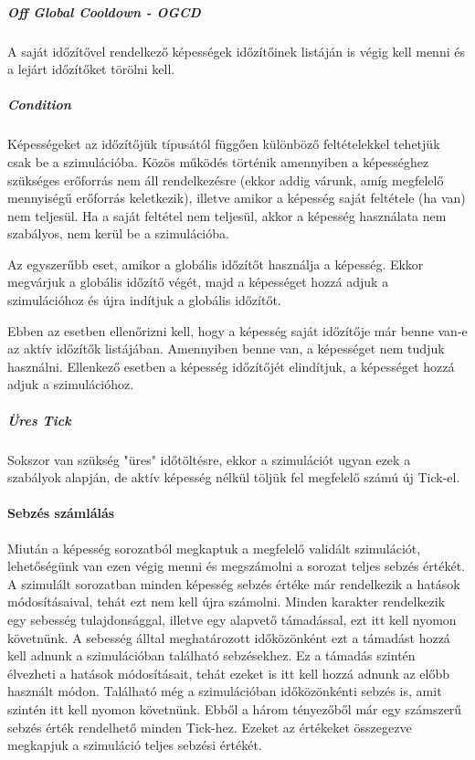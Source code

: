 \documentclass[12pt]{article}
\begin{document}
\subparagraph{Off Global Cooldown - OGCD}
A saját időzítővel rendelkező képességek időzítőinek listáján is végig kell menni és a lejárt időzítőket törölni kell.

\subparagraph{Condition}
Képességeket az időzítőjük típusától függően különböző feltételekkel tehetjük csak be a szimulációba.
Közös működés történik amennyiben a képességhez szükséges erőforrás nem áll rendelkezésre (ekkor addig várunk, amíg megfelelő mennyiségű erőforrás keletkezik), illetve amikor a képesség saját feltétele (ha van) nem teljesül. Ha a saját feltétel nem teljesül, akkor a képesség használata nem szabályos, nem kerül be a szimulációba.

\begin{description}[align=right,labelwidth=3cm]
	\item [GCD] Az egyszerűbb eset, amikor a globális időzítőt használja a képesség. Ekkor megvárjuk a globális időzítő végét, majd a képességet hozzá adjuk a szimulációhoz és újra indítjuk a globális időzítőt.
	\item [OGCD] Ebben az esetben ellenőrizni kell, hogy a képesség saját időzítője már benne van-e az aktív időzítők listájában. Amennyiben benne van, a képességet nem tudjuk használni. Ellenkező esetben a képesség időzítőjét elindítjuk, a képességet hozzá adjuk a szimulációhoz.
\end{description}

\subparagraph{Üres Tick}
Sokszor van szükség "üres" időtöltésre, ekkor a szimulációt ugyan ezek a szabályok alapján, de aktív képesség nélkül töljük fel megfelelő számú új Tick-el.

\paragraph{Sebzés számlálás}

Miután a képesség sorozatból megkaptuk a megfelelő validált szimulációt, lehetőségünk van ezen végig menni és megszámolni a sorozat teljes sebzés értékét. A szimulált sorozatban minden képesség sebzés értéke már rendelkezik a hatások módosításaival, tehát ezt nem kell újra számolni. 
Minden karakter rendelkezik egy sebesség tulajdonsággal, illetve egy alapvető támadással, ezt itt kell nyomon követnünk. A sebesség álltal meghatározott időközönként ezt a támadást hozzá kell adnunk a szimulációban található sebzésekhez. Ez a támadás szintén élvezheti a hatások módosításait, tehát ezeket is itt kell hozzá adnunk az előbb használt módon.
Található még a szimulációban időközönkénti sebzés is, amit szintén itt kell nyomon követnünk.
\newline
Ebből a három tényezőből már egy számszerű sebzés érték rendelhető minden Tick-hez. Ezeket az értékeket összegezve megkapjuk a szimuláció teljes sebzési értékét.
\end{document}
